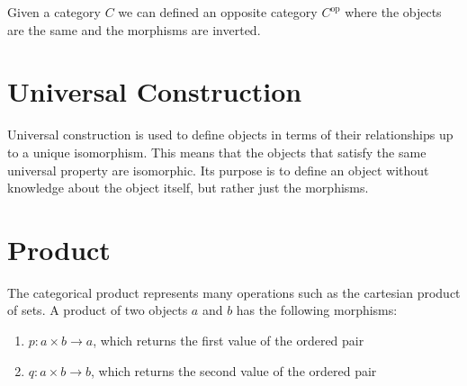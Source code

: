 \documentclass{article}
\newcommand{\opp}[1]{{#1}^{\text{op}}}
\begin{document}
Given a category \(C\) we can defined an opposite category \(\opp{C}\)
where the objects are the same and the morphisms are inverted.

\begin{minipage}{0.5\textwidth}
    \begin{center}
    \end{center}
\end{minipage}
\begin{minipage}{0.5\textwidth}
    \begin{center}
    \end{center}
\end{minipage}

\pagebreak

\section{Universal Construction}

Universal construction is used to define objects in terms of their
relationships up to a unique isomorphism.
This means that the objects that satisfy the same universal property
are isomorphic.
Its purpose is to define an object without knowledge about the object itself,
but rather just the morphisms.

\section{Product}

The categorical product represents many operations
such as the cartesian product of sets.
A product of two objects \(a\) and \(b\) has the following
morphisms:
\begin{enumerate}
    \item \(p:a\times b \to a\), which returns the first value of the ordered pair
    \item \(q:a\times b \to b\), which returns the second value of the ordered pair
\end{enumerate}
\end{document}
